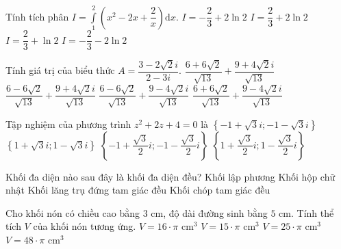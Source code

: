 \begin{ex}%
	Tính tích phân $ I=\displaystyle\int\limits_{1}^{2}\left(x^{2}-2x+\dfrac{2}{x}\right)\mathrm{d}x $.
	\choice
	{\True $ I=-\dfrac{2}{3}+2\ln 2  $}
	{$ I=\dfrac{2}{3}+2\ln 2  $}
	{$ I=\dfrac{2}{3}+\ln 2  $}
	{$ I=-\dfrac{2}{3}-2\ln 2  $}
\end{ex}

\begin{ex}%
	Tính giá trị của biểu thức $ A=\dfrac{3-2\sqrt{2}i}{2-3i} $.
	\choice
	{$ \dfrac{6+6\sqrt{2}}{\sqrt{13}}+\dfrac{9+4\sqrt{2}i}{\sqrt{13}}  $}
	{$ \dfrac{6-6\sqrt{2}}{\sqrt{13}}+\dfrac{9+4\sqrt{2}i}{\sqrt{13}}  $}
	{$ \dfrac{6-6\sqrt{2}}{\sqrt{13}}+\dfrac{9-4\sqrt{2}i}{\sqrt{13}}  $}
	{\True $ \dfrac{6+6\sqrt{2}}{\sqrt{13}}+\dfrac{9-4\sqrt{2}i}{\sqrt{13}}  $}
\end{ex}

\begin{ex}%
	Tập nghiệm của phương trình $ z^{2}+2z+4=0 $ là
	\choice
	{\True $ \left\lbrace -1+\sqrt{3}i;-1-\sqrt{3}i\right\rbrace  $}
	{$ \left\lbrace 1+\sqrt{3}i;1-\sqrt{3}i\right\rbrace  $}
	{$ \left\lbrace -1+\dfrac{\sqrt{3}}{2}i;-1-\dfrac{\sqrt{3}}{2}i\right\rbrace  $}
	{$ \left\lbrace 1+\dfrac{\sqrt{3}}{2}i;1-\dfrac{\sqrt{3}}{2}i\right\rbrace  $}
\end{ex}

\begin{ex}%
	Khối đa diện nào sau đây là khối đa diện đều? 
	\choice
	{\True Khối lập phương}
	{Khối hộp chữ nhật}
	{Khối lăng trụ đứng tam giác đều}
	{Khối chóp tam giác đều}
\end{ex}


\begin{ex}%
	Cho khối nón có chiều cao bằng $3$ cm, độ dài đường sinh bằng $5$ cm. Tính thể tích $V$ của khối nón tương ứng.
	\choice
	{\True $V=16\cdot \pi$ cm$^{3}$}
	{$V=15\cdot \pi$ cm$^{3}$}
	{$V=25\cdot\pi$ cm$^{3}$}
	{$V=48\cdot \pi$ cm$^{3}$}
\end{ex}	

